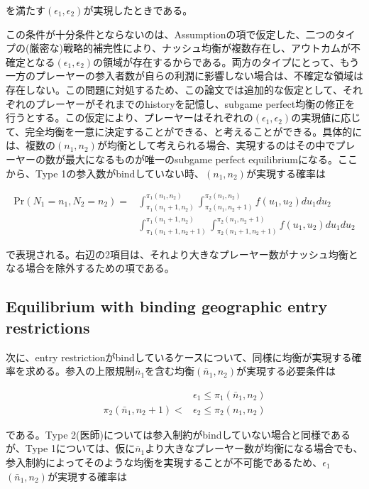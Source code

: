 \documentclass[11pt]{jsarticle}
\begin{document}
を満たす$(\epsilon_1, \epsilon_2)$が実現したときである。

この条件が十分条件とならないのは、Assumptionの項で仮定した、二つのタイプの(厳密な)戦略的補完性により、ナッシュ均衡が複数存在し、アウトカムが不確定となる$(\epsilon_1, \epsilon_2)$の領域が存在するからである。両方のタイプにとって、もう一方のプレーヤーの参入者数が自らの利潤に影響しない場合は、不確定な領域は存在しない。この問題に対処するため、この論文では追加的な仮定として、それぞれのプレーヤーがそれまでのhistoryを記憶し、subgame perfect均衡の修正を行うとする。この仮定により、プレーヤーはそれぞれの$(\epsilon_1, \epsilon_2)$の実現値に応じて、完全均衡を一意に決定することができる、と考えることができる。具体的には、複数の$(n_1, n_2)$が均衡として考えられる場合、実現するのはその中でプレーヤーの数が最大になるものが唯一のsubgame perfect equilibriumになる。ここから、Type 1の参入数がbindしていない時、$(n_1, n_2)$が実現する確率は

\begin{align*}
  \text{Pr}(N_1 = n_1, N_2 = n_2) =& \int_{\pi_1(n_1 + 1, n_2)}^{\pi_1(n_1, n_2)} \int_{\pi_2(n_1, n_2 + 1)}^{\pi_2(n_1, n_2)} f(u_1, u_2) du_1 du_2 \\
  &  \int_{\pi_1(n_1 + 1, n_2 + 1)}^{\pi_1(n_1 + 1, n_2)} \int_{\pi_2(n_1 + 1, n_2 + 1)}^{\pi_2(n_1, n_2 + 1)} f(u_1, u_2) du_1 du_2
\end{align*}

で表現される。右辺の2項目は、それより大きなプレーヤー数がナッシュ均衡となる場合を除外するための項である。

\subsection{Equilibrium with binding geographic entry restrictions}

次に、entry restrictionがbindしているケースについて、同様に均衡が実現する確率を求める。参入の上限規制$\bar{n}_1$を含む均衡$(\bar{n}_1, n_2)$が実現する必要条件は

\begin{align*}
  & \epsilon_1 \leq \pi_1(\bar{n}_1, n_2) \\
  \pi_2(\bar{n}_1, n_2 + 1) < & \epsilon_2 \leq \pi_2 (n_1, n_2)
\end{align*}

である。Type 2(医師)については参入制約がbindしていない場合と同様であるが、Type 1については、仮に$\bar{n}_1$より大きなプレーヤー数が均衡になる場合でも、参入制約によってそのような均衡を実現することが不可能であるため、$\epsilon_1$$(\bar{n}_1, n_2)$が実現する確率は
\end{document}
